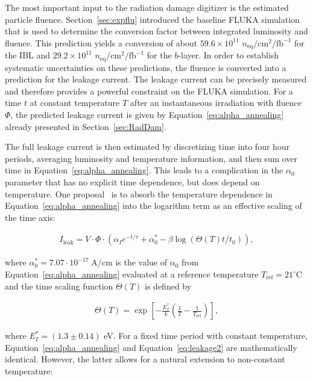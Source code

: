  The most important input to the radiation damage digitizer is the estimated particle fluence.  
 Section~\ref{sec:expflu} introduced the baseline FLUKA simulation that is used to determine the 
 conversion factor between integrated luminosity and fluence. This prediction yields a conversion of
  about $59.6\times 10^{11}$ $n_\text{eq}/\text{cm}^2/\text{fb}^{-1}$ for the IBL and $29.2\times 10^{11}$ $n_\text{eq}/\text{cm}^2/\text{fb}^{-1}$ for the $b$-layer. In order to establish systematic uncertainties on these predictions, the fluence is converted into a prediction for the leakage current. The leakage 
current can be precisely measured and therefore provides a powerful constraint on the FLUKA simulation. For a time $t$ at constant temperature $T$ after an instantaneous irradiation with fluence $\Phi$, the predicted leakage current is given by Equation~\ref{eq:alpha_annealing} already presented 
in Section~\ref{sec:RadDam}.

The full leakage current is then estimated by discretizing time into four hour periods, averaging luminosity and temperature information, and then sum over time in Equation~\ref{eq:alpha_annealing}.  This leads to a complication in the $\alpha_0$ parameter that has no explicit time dependence, but does depend on temperature.  One proposal~\cite{moll-thesis} is to absorb the temperature dependence in Equation~\ref{eq:alpha_annealing} into the logarithm term as an effective scaling of the time axis:

\begin{align}
\label{eq:leakage2}
I_\text{leak}=V\cdot\Phi\cdot\left(\alpha_Ie^{-t/\tau}+\alpha_0^*-\beta\log(\Theta(T)t/t_0)\right),
\end{align}

\noindent where $\alpha_0^*=7.07\cdot 10^{-17}\;$A/cm is the value of $\alpha_0$ from Equation~\ref{eq:alpha_annealing} evaluated at a reference temperature $T_\text{ref}=21^{\circ}$C and the time scaling function $\Theta(T)$ is defined by

\begin{align}
\label{eq:tempscaling}
\Theta(T) = \exp \left[ - \frac{E_I^*}{k } \left( \frac{1}{T} - \frac{1}{T_\text{ref} } \right) \right],
\end{align}

where $E_I^*=(1.3\pm 0.14)$ eV.  For a fixed time period with constant temperature, Equation~\ref{eq:alpha_annealing} and Equation~\ref{eq:leakage2} are mathematically identical.  However, the latter allows for a natural extension to non-constant temperature:

